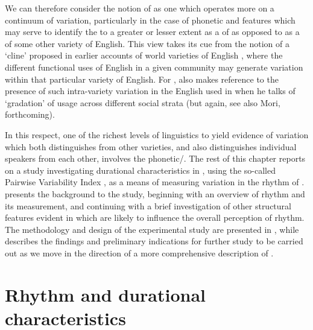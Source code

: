 \documentclass[output=paper]{langsci/langscibook}
\begin{document}
We can therefore consider the notion of  as one which operates more on a continuum of variation, particularly in the case of phonetic and  features which may serve to identify the  to a greater or lesser extent as a  of  as opposed to as a  of some other variety of English. This view takes its cue from the notion of a ‘cline’ proposed in earlier  accounts of world varieties of English \citep[57]{Kachru1992}, where the different functional uses of English in a given community may generate variation within that particular variety of English. For , \citet[4]{Borg1980} also makes reference to the presence of such intra-variety variation in the English used in  when he talks of ‘gradation’ of usage across different social strata (but again, see also Mori, forthcoming).

In this respect, one of the richest levels of linguistics to yield evidence of variation which both distinguishes  from other varieties, and also distinguishes individual  speakers from each other, involves the phonetic/. The rest of this chapter reports on a study investigating durational characteristics in , using the so-called Pairwise Variability Index \citep{GrabeLow2002}, as a means of measuring variation in the rhythm of .  presents the background to the study, beginning with an overview of rhythm and its measurement, and continuing with a brief investigation of other structural features evident in  which are likely to influence the overall perception of rhythm. The methodology and design of the experimental study are presented in , while  describes the findings and preliminary indications for further study to be carried out as we move in the direction of a more comprehensive description of .

\section{Rhythm and durational characteristics}
\label{sec:key:grech2}
\end{document}
